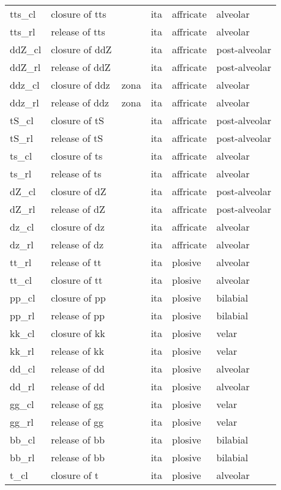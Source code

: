 {\begin{longtable}{l|p{.3\linewidth}|p{.15\linewidth}|l|p{.15\linewidth}|l}
	tts\_cl	& closure of tts	& 	& ita	& affricate	& alveolar	\\
	tts\_rl	& release of tts	& 	& ita	& affricate	& alveolar	\\
	ddZ\_cl	& closure of ddZ	& 	& ita	& affricate	& post-alveolar	\\
	ddZ\_rl	& release of ddZ	& 	& ita	& affricate	& post-alveolar	\\
	ddz\_cl	& closure of ddz	& zona	& ita	& affricate	& alveolar	\\
	ddz\_rl	& release of ddz	& zona	& ita	& affricate	& alveolar	\\
	tS\_cl	& closure of tS	& 	& ita	& affricate	& post-alveolar	\\
	tS\_rl	& release of tS	& 	& ita	& affricate	& post-alveolar	\\
	ts\_cl	& closure of ts	& 	& ita	& affricate	& alveolar	\\
	ts\_rl	& release of ts	& 	& ita	& affricate	& alveolar	\\
	dZ\_cl	& closure of dZ	& 	& ita	& affricate	& post-alveolar	\\
	dZ\_rl	& release of dZ	& 	& ita	& affricate	& post-alveolar	\\
	dz\_cl	& closure of dz	& 	& ita	& affricate	& alveolar	\\
	dz\_rl	& release of dz	& 	& ita	& affricate	& alveolar	\\
	tt\_rl	& release of tt	& 	& ita	& plosive	& alveolar	\\
	tt\_cl	& closure of tt	& 	& ita	& plosive	& alveolar	\\
	pp\_cl	& closure of pp	& 	& ita	& plosive	& bilabial	\\
	pp\_rl	& release of pp	& 	& ita	& plosive	& bilabial	\\
	kk\_cl	& closure of kk	& 	& ita	& plosive	& velar	\\
	kk\_rl	& release of kk	& 	& ita	& plosive	& velar	\\
	dd\_cl	& release of dd	& 	& ita	& plosive	& alveolar	\\
	dd\_rl	& release of dd	& 	& ita	& plosive	& alveolar	\\
	gg\_cl	& release of gg	& 	& ita	& plosive	& velar	\\
	gg\_rl	& release of gg	& 	& ita	& plosive	& velar	\\
	bb\_cl	& release of bb	& 	& ita	& plosive	& bilabial	\\
	bb\_rl	& release of bb	& 	& ita	& plosive	& bilabial	\\
	t\_cl	& closure of t	& 	& ita	& plosive	& alveolar	\\

\end{longtable}}
